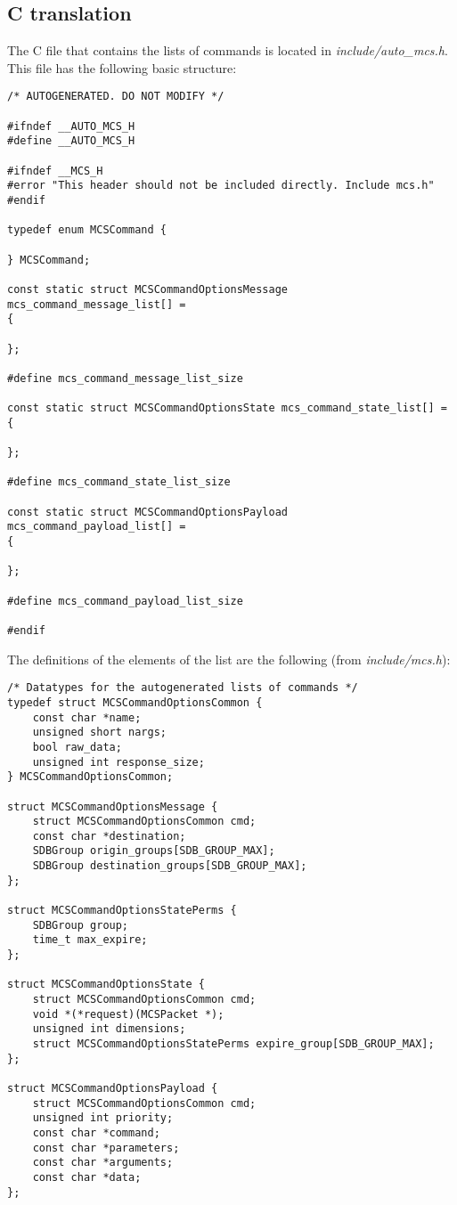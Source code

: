 \documentclass[12pt,a4paper]{report}
\begin{document}
\subsection*{C translation}
The C file that contains the lists of commands is located in \textit{include/auto\_mcs.h}. This file has the following basic structure:

\begin{lstlisting}
/* AUTOGENERATED. DO NOT MODIFY */

#ifndef __AUTO_MCS_H
#define __AUTO_MCS_H

#ifndef __MCS_H
#error "This header should not be included directly. Include mcs.h"
#endif

typedef enum MCSCommand {
    
} MCSCommand;

const static struct MCSCommandOptionsMessage mcs_command_message_list[] =
{
    
};

#define mcs_command_message_list_size 

const static struct MCSCommandOptionsState mcs_command_state_list[] =
{
    
};

#define mcs_command_state_list_size 

const static struct MCSCommandOptionsPayload mcs_command_payload_list[] =
{
    
};

#define mcs_command_payload_list_size 

#endif
\end{lstlisting}

The definitions of the elements of the list are the following (from \textit{include/mcs.h}):
\begin{lstlisting}
/* Datatypes for the autogenerated lists of commands */
typedef struct MCSCommandOptionsCommon {
    const char *name;
    unsigned short nargs;
    bool raw_data;
    unsigned int response_size;
} MCSCommandOptionsCommon;

struct MCSCommandOptionsMessage {
    struct MCSCommandOptionsCommon cmd;
    const char *destination;
    SDBGroup origin_groups[SDB_GROUP_MAX];
    SDBGroup destination_groups[SDB_GROUP_MAX];
};

struct MCSCommandOptionsStatePerms {
    SDBGroup group;
    time_t max_expire;
};

struct MCSCommandOptionsState {
    struct MCSCommandOptionsCommon cmd;
    void *(*request)(MCSPacket *);
    unsigned int dimensions;
    struct MCSCommandOptionsStatePerms expire_group[SDB_GROUP_MAX];
};

struct MCSCommandOptionsPayload {
    struct MCSCommandOptionsCommon cmd;
    unsigned int priority;
    const char *command;
    const char *parameters;
    const char *arguments;
    const char *data;
};
\end{lstlisting}
\end{document}
